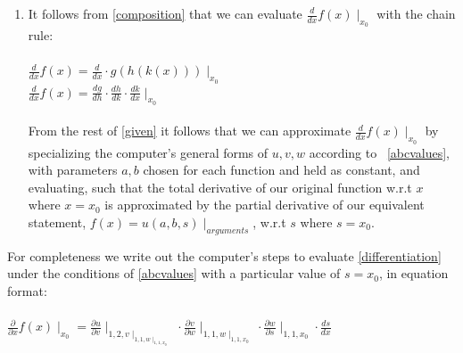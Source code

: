 \documentclass[preprint,12pt]{elsarticle}
\begin{document}
\begin{enumerate}
\item 
\label{differentiation}
It follows from \ref{composition} that we can evaluate $\frac{d}{d x}f(x) \mid_{x_0}$ with the chain rule: \\ \\
$\frac{d}{d x}f(x) = \frac{d}{d x} \cdot g(h(k(x))) \mid_{x_0}$ \\
$\frac{d}{d x}f(x) =  \frac{d{g}}{d{h}} \cdot \frac{d{h}}{d{k}}
\cdot \frac{d{k}}{d{x}}\mid_{x_0}$ \\ \\
From the rest of \ref{given} it follows that we can approximate  $\frac{d}{d x}f(x) \mid_{x_0}$ by
specializing the computer's general forms of $u, v, w$ 
according to ~\ref{abcvalues}, with parameters $a, b$ chosen for each function and held as constant, and
evaluating, such that the total derivative of our original function w.r.t $x$ where $x = x_0$ is approximated
by the partial derivative of our equivalent statement, $f(x) = u(a, b, s) \mid_{arguments}$,  w.r.t $s$ 
where $s = x_0$. \\

\end{enumerate}
\label{doingthework}
For completeness we write out the computer's steps to evaluate \ref{differentiation} under the conditions of
\ref{abcvalues} with a particular value of $s = x_0$, in equation format: \\ \\
$\frac{\partial}{\partial x}f(x) \mid _{x_0} = \frac{\partial{u}}{\partial{v}} \mid _{1, 2, v \mid _{1, 1, w \mid _{ 1, 1, x_0}}} \cdot \frac{\partial{v}}{\partial{w}} \mid _{1,1, w \mid _{1, 1, x_0}} \cdot \frac{\partial{w}}{\partial{s}} \mid _{1, 1, x_0} \cdot \frac{ds}{dx}$\\ \\
\end{document}
